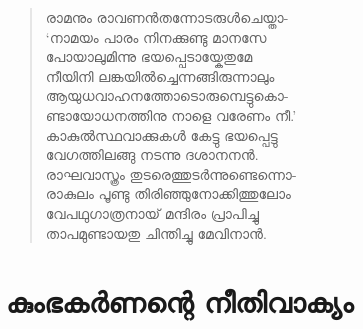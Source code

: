 \begin{verse}
രാമനും രാവണന്‍തന്നോടരുള്‍ചെയ്താ-\\
‘നാമയം പാരം നിനക്കുണ്ടു മാനസേ\\
പോയാലുമിന്നു ഭയപ്പെടായ്കേതുമേ\\
നീയിനി ലങ്കയില്‍ച്ചെന്നങ്ങിരുന്നാലും\\
ആയുധവാഹനത്തോടൊരുമ്പെട്ടുകൊ-\\
ണ്ടായോധനത്തിനു നാളെ വരേണം നീ.’\\
കാകുല്‍സ്ഥവാക്കുകള്‍ കേട്ടു ഭയപ്പെട്ടു\\
വേഗത്തിലങ്ങു നടന്നു ദശാനനന്‍.\\
രാഘവാസ്ത്രം തുടരെത്തുടര്‍ന്നുണ്ടെന്നൊ-\\
രാകുലം പൂണ്ടു തിരിഞ്ഞുനോക്കിത്തുലോം\\
വേപഥുഗാത്രനായ് മന്ദിരം പ്രാപിച്ചു\\
താപമുണ്ടായതു ചിന്തിച്ചു മേവിനാന്‍.
\end{verse}


\section{കുംഭകര്‍ണന്റെ നീതിവാക്യം}


